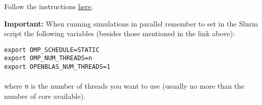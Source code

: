 \documentclass[12pt]{article}
\begin{document}
Follow the instructions \href{https://docs.computecanada.ca/wiki/Running_jobs}{\underline{here}}.

\textbf{Important:} When running simulations in parallel remember to set in the Slurm script the following variables (besides those mentioned in the link above):
\begin{tcolorbox}
\texttt{export OMP\_SCHEDULE=STATIC} \\
\texttt{export OMP\_NUM\_THREADS=n} \\
\texttt{export OPENBLAS\_NUM\_THREADS=1} \\
\\
{where \texttt{n} is the number of threads you want to use (usually no more than the number of core available).}
\end{tcolorbox}
\end{document}
